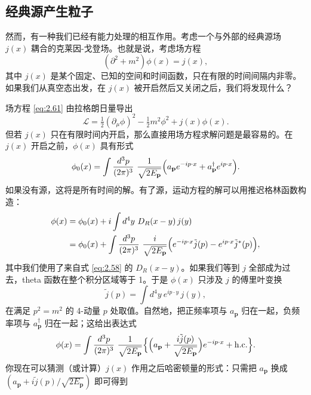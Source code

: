 \subsection{经典源产生粒子}

然而，有一种我们已经有能力处理的相互作用。考虑一个与外部的经典源场 $j(x)$ 耦合的克莱因-戈登场。也就是说，考虑场方程
\begin{equation}
  (\partial^2 + m^2)\phi(x) = j(x),
  \label{eq:2.61}
\end{equation}
其中 $j(x)$ 是某个固定、已知的空间和时间函数，只在有限的时间间隔内非零。如果我们从真空态出发，在 $j(x)$ 被开启然后又关闭之后，我们将发现什么？

场方程 \eqref{eq:2.61} 由拉格朗日量导出
\begin{equation}
  \mathcal{L} = \tfrac{1}{2}(\partial_\mu\phi)^2 - \tfrac{1}{2}m^2\phi^2
    + j(x)\phi(x) .
  \label{eq:2.62}
\end{equation}
但若 $j(x)$ 只在有限时间内开启，那么直接用场方程求解问题是最容易的。在 $j(x)$ 开启之前，$\phi(x)$ 具有形式
\[
  \phi_0(x) = \int \frac{d^3p}{(2\pi)^3}\ \frac{1}{\sqrt{2E_{\mathbf{p}}}}
    \Bigl( a_{\mathbf{p}}e^{-ip\cdot x}
      + a_{\mathbf{p}}^\dagger e^{ip\cdot x} \Bigr).
\]
如果没有源，这将是所有时间的解。有了源，运动方程的解可以用推迟格林函数构造：
\begin{align}
  \phi(x) &= \phi_0(x) + i\int d^4y\ D_R(x-y)\,j(y)\\
  &= \phi_0(x) + \int \frac{d^3p}{(2\pi)^3}\ \frac{i}{\sqrt{2E_{\mathbf{p}}}}
    \Bigl( e^{-ip\cdot x}\tilde{j}(p) - e^{ip\cdot x}\tilde{j}^{*}(p)
      \Bigr),
  \label{eq:2.63}
\end{align}
其中我们使用了来自式 \eqref{eq:2.58} 的 $D_R(x-y)$。如果我们等到 $j$ 全部成为过去，theta 函数在整个积分区域等于 1。于是 $\phi(x)$ 只涉及 $j$ 的傅里叶变换
\begin{equation}
  \tilde{j}(p) = \int d^4y\ e^{ip\cdot y}\,j(y),
\end{equation}
在满足 $p^2=m^2$ 的 4-动量 $p$ 处取值。自然地，把正频率项与 $a_{\mathbf{p}}$ 归在一起，负频率项与 $a_{\mathbf{p}}^\dagger$ 归在一起；这给出表达式
\begin{equation}
  \phi(x) = \int \frac{d^3p}{(2\pi)^3}\ \frac{1}{\sqrt{2E_{\mathbf{p}}}}
    \Bigl\{ \Bigl( a_{\mathbf{p}}
      + \frac{i\tilde{j}(p)}{\sqrt{2E_{\mathbf{p}}}} \Bigr)e^{-ip\cdot x}
      + \mathrm{h.c.} \Bigr\}.
  \label{eq:2.64}
\end{equation}
你现在可以猜测（或计算）$j(x)$ 作用之后哈密顿量的形式：只需把 $a_{\mathbf{p}}$ 换成 $(a_{\mathbf{p}} + i\tilde{j}(p)/\sqrt{2E_{\mathbf{p}}})$ 即可得到
